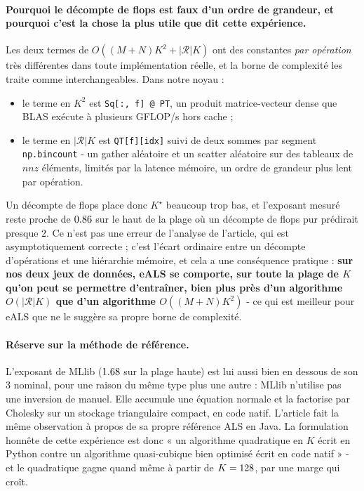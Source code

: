 \paragraph{Pourquoi le décompte de flops est faux d'un ordre de grandeur, et pourquoi
c'est la chose la plus utile que dit cette expérience.} Les deux termes de
$O((M{+}N)K^2+|\mathcal{R}|K)$ ont des constantes \emph{par opération} très
différentes dans toute implémentation réelle, et la borne de complexité les traite
comme interchangeables. Dans notre noyau :
\begin{itemize}\itemsep2pt
\item le terme en $K^2$ est \texttt{Sq[:, f] @ PT}, un produit matrice-vecteur dense
que BLAS exécute à plusieurs GFLOP/s hors cache ;
\item le terme en $|\mathcal{R}|K$ est \texttt{QT[f][idx]} suivi de deux sommes par
segment \texttt{np.bincount} - un gather aléatoire et un scatter aléatoire sur des
tableaux de $\textit{nnz}$ éléments, limités par la latence mémoire, un ordre de
grandeur plus lent par opération.
\end{itemize}
Un décompte de flops place donc $K^{\star}$ beaucoup trop bas, et l'exposant mesuré
reste proche de $0.86$ sur le haut de la plage où un décompte de flops pur
prédirait presque $2$. Ce n'est pas une erreur de l'analyse de l'article, qui est
asymptotiquement correcte ; c'est l'écart ordinaire entre un décompte d'opérations et
une hiérarchie mémoire, et cela a une conséquence pratique : \textbf{sur nos deux
jeux de données, eALS se comporte, sur toute la plage de $K$ qu'on peut se permettre
d'entraîner, bien plus près d'un algorithme $O(|\mathcal{R}|K)$ que d'un algorithme
$O((M{+}N)K^2)$} - ce qui est meilleur pour eALS que ne le suggère sa propre borne
de complexité.

\paragraph{Réserve sur la méthode de référence.} L'exposant de MLlib ($1.68$ sur la
plage haute) est lui aussi bien en dessous de son $3$ nominal, pour une raison du même
type plus une autre : MLlib n'utilise pas une inversion de manuel. Elle accumule une
équation normale et la factorise par Cholesky sur un stockage triangulaire compact, en
code natif. L'article fait la même observation à propos de sa propre référence ALS en
Java. La formulation honnête de cette expérience est donc « un algorithme quadratique
en $K$ écrit en Python contre un algorithme quasi-cubique bien optimisé écrit en code
natif » - et le quadratique gagne quand même à partir de $K=128$, par une
marge qui croît.

